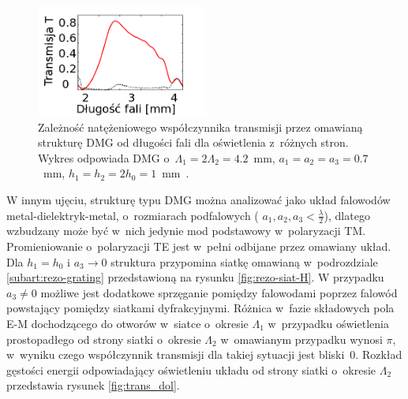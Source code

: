 \begin{figure}
	\centering
	\includegraphics[width=0.5\textwidth]{images/thz/opt_lett_spect.png}
	\caption{Zależność natężeniowego współczynnika transmisji przez omawianą strukturę DMG od długości fali dla oświetlenia z~różnych stron. Wykres odpowiada DMG o~$\Lambda_1= 2 \Lambda_2 = 4.2$~mm, $a_1=a_2=a_3=0.7$~mm, $h_1=h_2=2 h_0=1$~mm~\cite{Stolarek:13}.}
	\label{fig:trans_freq}
\end{figure}

 W innym ujęciu, strukturę typu DMG można analizować jako układ falowodów metal-dielektryk-metal, o~rozmiarach podfalowych ( $a_1,a_2,a_3 < \frac{\lambda}{2}$), dlatego wzbudzany może być w~nich jedynie mod podstawowy w~polaryzacji TM. Promieniowanie o~polaryzacji TE jest w~pełni odbijane przez omawiany układ. Dla $h_1=h_0$ i $a_3 \to 0$ struktura przypomina siatkę omawianą w~podrozdziale \ref{subart:rezo-grating} przedstawioną na rysunku \ref{fig:rezo-siat-H}. W przypadku $a_3 \ne 0$ możliwe jest dodatkowe sprzęganie pomiędzy falowodami poprzez falowód powstający pomiędzy siatkami dyfrakcyjnymi. Różnica w~fazie składowych pola E-M dochodzącego do otworów w~siatce o~okresie $\Lambda_1$ w~przypadku oświetlenia prostopadłego od strony siatki o~okresie $\Lambda_2$ w~omawianym przypadku wynosi $\pi$, w~wyniku czego współczynnik transmisji dla takiej sytuacji jest bliski~0. Rozkład gęstości energii odpowiadający oświetleniu układu od strony siatki o~okresie $\Lambda_2$ przedstawia rysunek \ref{fig:trans_dol}.


